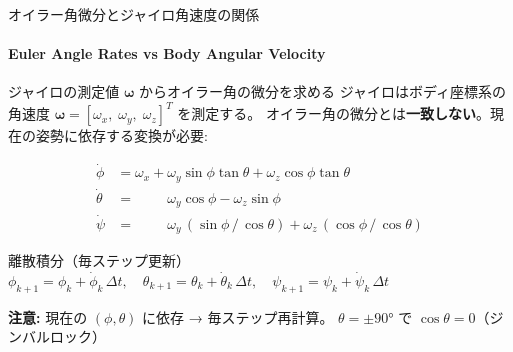 \documentclass[aspectratio=169, 14pt]{beamer}
\begin{document}
\begin{frame}{オイラー角微分とジャイロ角速度の関係}
  \framesubtitle{Euler Angle Rates vs Body Angular Velocity}

  \begin{block}{ジャイロの測定値 $\boldsymbol{\omega}$ からオイラー角の微分を求める}
    {\small
    ジャイロはボディ座標系の角速度 $\boldsymbol{\omega} = [\omega_x,\;\omega_y,\;\omega_z]^T$ を測定する。
    オイラー角の微分とは\textbf{一致しない}。現在の姿勢に依存する変換が必要:
    }
  \end{block}

  \vspace{-1.0em}
  {\small
  \begin{align*}
    \dot{\phi}   &= \omega_x
                  + \omega_y \sin\phi\tan\theta
                  + \omega_z \cos\phi\tan\theta \\
    \dot{\theta} &= \phantom{\omega_x +{}}
                    \omega_y \cos\phi
                  - \omega_z \sin\phi \\
    \dot{\psi}   &= \phantom{\omega_x +{}}
                    \omega_y \,(\sin\phi\,/\,\cos\theta)
                  + \omega_z \,(\cos\phi\,/\,\cos\theta)
  \end{align*}
  }

  \vspace{-0.8em}

  \begin{exampleblock}{離散積分（毎ステップ更新）}
    {\small
    $\phi_{k+1} = \phi_k + \dot{\phi}_k\,\Delta t,\quad
    \theta_{k+1} = \theta_k + \dot{\theta}_k\,\Delta t,\quad
    \psi_{k+1} = \psi_k + \dot{\psi}_k\,\Delta t$
    }
  \end{exampleblock}

  \vspace{-0.2em}

  {\footnotesize
    \textbf{注意:}
    現在の $(\phi,\theta)$ に依存 → 毎ステップ再計算。
    $\theta{=}\pm 90°$ で $\cos\theta{=}0$（ジンバルロック）
  }
\end{frame}
\end{document}

